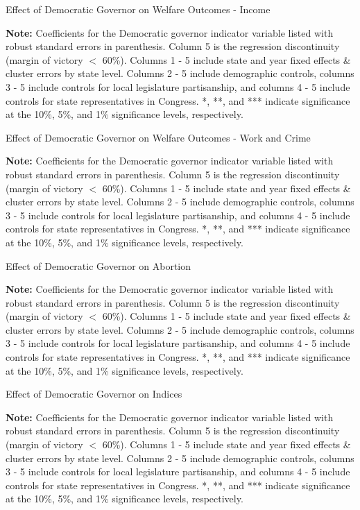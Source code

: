 \documentclass{article}
\makeatletter
\let\estinput=%
\newcommand{\estwide}[3]{
		\vspace{.75ex}{
			\begin{tabular*}
			{\textwidth}{@{\hskip\tabcolsep\extracolsep\fill}l*{#2}{#3}}
			\toprule
			\estinput{#1}
			\bottomrule
			\addlinespace[.75ex]
			\end{tabular*}
			}
		}
\makeatother
\begin{document}
\begin{table}[!hbtp]
\caption{Effect of Democratic Governor on Welfare Outcomes - Income}

\textbf{Note:} Coefficients for the Democratic governor indicator variable listed with robust standard errors in parenthesis. Column 5 is the regression discontinuity (margin of victory $<$ 60\%). Columns 1 - 5 include state and year fixed effects \& cluster errors by state level. Columns 2 - 5 include demographic controls, columns 3 - 5 include controls for local legislature partisanship, and columns 4 - 5 include controls for state representatives in Congress. *, **, and *** indicate significance at the 10\%, 5\%, and 1\% significance levels, respectively.
\label{table:welfare1_a}
\end{table}

\begin{table}[!hbtp]
\caption{Effect of Democratic Governor on Welfare Outcomes - Work and Crime}

\textbf{Note:} Coefficients for the Democratic governor indicator variable listed with robust standard errors in parenthesis. Column 5 is the regression discontinuity (margin of victory $<$ 60\%). Columns 1 - 5 include state and year fixed effects \& cluster errors by state level. Columns 2 - 5 include demographic controls, columns 3 - 5 include controls for local legislature partisanship, and columns 4 - 5 include controls for state representatives in Congress. *, **, and *** indicate significance at the 10\%, 5\%, and 1\% significance levels, respectively.
\label{table:welfare2_a}
\end{table}

\begin{table}[!hbtp]
\caption{Effect of Democratic Governor on Abortion}
\textbf{Note:} Coefficients for the Democratic governor indicator variable listed with robust standard errors in parenthesis. Column 5 is the regression discontinuity (margin of victory $<$ 60\%). Columns 1 - 5 include state and year fixed effects \& cluster errors by state level. Columns 2 - 5 include demographic controls, columns 3 - 5 include controls for local legislature partisanship, and columns 4 - 5 include controls for state representatives in Congress. *, **, and *** indicate significance at the 10\%, 5\%, and 1\% significance levels, respectively.
\label{table:abortion_a}
\end{table}

\begin{table}[!hbtp]
\caption{Effect of Democratic Governor on Indices}

\textbf{Note:} Coefficients for the Democratic governor indicator variable listed with robust standard errors in parenthesis. Column 5 is the regression discontinuity (margin of victory $<$ 60\%). Columns 1 - 5 include state and year fixed effects \& cluster errors by state level. Columns 2 - 5 include demographic controls, columns 3 - 5 include controls for local legislature partisanship, and columns 4 - 5 include controls for state representatives in Congress. *, **, and *** indicate significance at the 10\%, 5\%, and 1\% significance levels, respectively.
\label{table:index_a}
\end{table}
\end{document}
